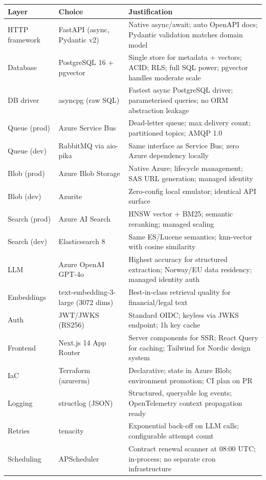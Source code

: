 \documentclass[12pt,a4paper]{article}
\begin{document}
\begin{tabularx}{\textwidth}{llX}
\toprule
\textbf{Layer} & \textbf{Choice} & \textbf{Justification} \\
\midrule
HTTP framework & FastAPI (async, Pydantic v2) & Native async/await; auto OpenAPI docs; Pydantic validation matches domain model \\
Database & PostgreSQL 16 + pgvector & Single store for metadata + vectors; ACID; RLS; full SQL power; pgvector handles moderate scale \\
DB driver & asyncpg (raw SQL) & Fastest async PostgreSQL driver; parameterised queries; no ORM abstraction leakage \\
Queue (prod) & Azure Service Bus & Dead-letter queue; max delivery count; partitioned topics; AMQP 1.0 \\
Queue (dev) & RabbitMQ via aio-pika & Same interface as Service Bus; zero Azure dependency locally \\
Blob (prod) & Azure Blob Storage & Native Azure; lifecycle management; SAS URL generation; managed identity \\
Blob (dev) & Azurite & Zero-config local emulator; identical API surface \\
Search (prod) & Azure AI Search & HNSW vector + BM25; semantic reranking; managed scaling \\
Search (dev) & Elasticsearch 8 & Same ES/Lucene semantics; knn-vector with cosine similarity \\
LLM & Azure OpenAI GPT-4o & Highest accuracy for structured extraction; Norway/EU data residency; managed identity auth \\
Embeddings & text-embedding-3-large (3072 dims) & Best-in-class retrieval quality for financial/legal text \\
Auth & JWT/JWKS (RS256) & Standard OIDC; keyless via JWKS endpoint; 1h key cache \\
Frontend & Next.js 14 App Router & Server components for SSR; React Query for caching; Tailwind for Nordic design system \\
IaC & Terraform (azurerm) & Declarative; state in Azure Blob; environment promotion; CI plan on PR \\
Logging & structlog (JSON) & Structured, queryable log events; OpenTelemetry context propagation ready \\
Retries & tenacity & Exponential back-off on LLM calls; configurable attempt count \\
Scheduling & APScheduler & Contract renewal scanner at 08:00 UTC; in-process; no separate cron infrastructure \\
\bottomrule
\end{tabularx}
\end{document}
